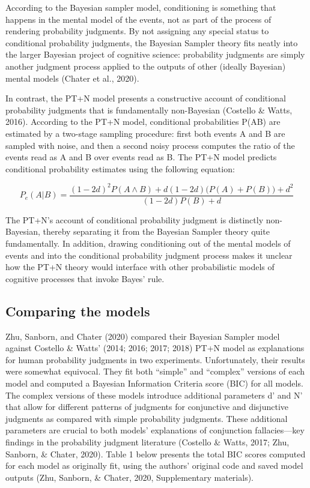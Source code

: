 \documentclass[
  english,
  man,floatsintext]{apa6}
\begin{document}
According to the Bayesian sampler model, conditioning is something that happens in the mental model of the events, not as part of the process of rendering probability judgments. By not assigning any special status to conditional probability judgments, the Bayesian Sampler theory fits neatly into the larger Bayesian project of cognitive science: probability judgments are simply another judgment process applied to the outputs of other (ideally Bayesian) mental models (Chater et al., 2020).

In contrast, the PT+N model presents a constructive account of conditional probability judgments that is fundamentally non-Bayesian (Costello \& Watts, 2016). According to the PT+N model, conditional probabilities P(A\textbar B) are estimated by a two-stage sampling procedure: first both events A and B are sampled with noise, and then a second noisy process computes the ratio of the events read as A and B over events read as B. The PT+N model predicts conditional probability estimates using the following equation:

\[P_e(A|B) = \frac{(1-2d)^2P(A \land B) + d(1-2d)\big(P(A)+P(B)\big)+d^2}{(1-2d)P(B)+d}\]

The PT+N's account of conditional probability judgment is distinctly non-Bayesian, thereby separating it from the Bayesian Sampler theory quite fundamentally. In addition, drawing conditioning out of the mental models of events and into the conditional probability judgment process makes it unclear how the PT+N theory would interface with other probabilistic models of cognitive processes that invoke Bayes' rule.

\hypertarget{comparing-the-models}{%
\subsection{Comparing the models}\label{comparing-the-models}}

Zhu, Sanborn, and Chater (2020) compared their Bayesian Sampler model against Costello \& Watts' (2014; 2016; 2017; 2018) PT+N model as explanations for human probability judgments in two experiments. Unfortunately, their results were somewhat equivocal. They fit both ``simple'' and ``complex'' versions of each model and computed a Bayesian Information Criteria score (BIC) for all models. The complex versions of these models introduce additional parameters d' and N' that allow for different patterns of judgments for conjunctive and disjunctive judgments as compared with simple probability judgments. These additional parameters are crucial to both models' explanations of conjunction fallacies---key findings in the probability judgment literature (Costello \& Watts, 2017; Zhu, Sanborn, \& Chater, 2020). Table 1 below presents the total BIC scores computed for each model as originally fit, using the authors' original code and saved model outputs (Zhu, Sanborn, \& Chater, 2020, Supplementary materials).
\end{document}
